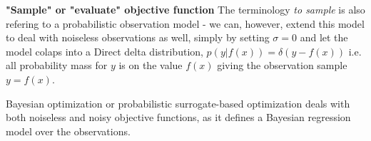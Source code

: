 
\begin{note}
    \textbf{"Sample" or "evaluate" objective function} 
    The terminology \textit{to sample} is also refering to a probabilistic observation model - we
    can, however, extend this model to deal with noiseless observations as well, simply by setting
    $\sigma = 0$ and let the model colaps into a Direct delta distribution, $p(y|f(x)) =
    \mathcal{\delta}(y-f(x))$ i.e. all probability mass for $y$ is on the value $f(x)$ giving the
    observation sample $y = f(x)$. 
\end{note}

Bayesian optimization or probabilistic surrogate-based optimization deals with both noiseless and noisy objective functions,
as it defines a Bayesian regression model over the observations.

